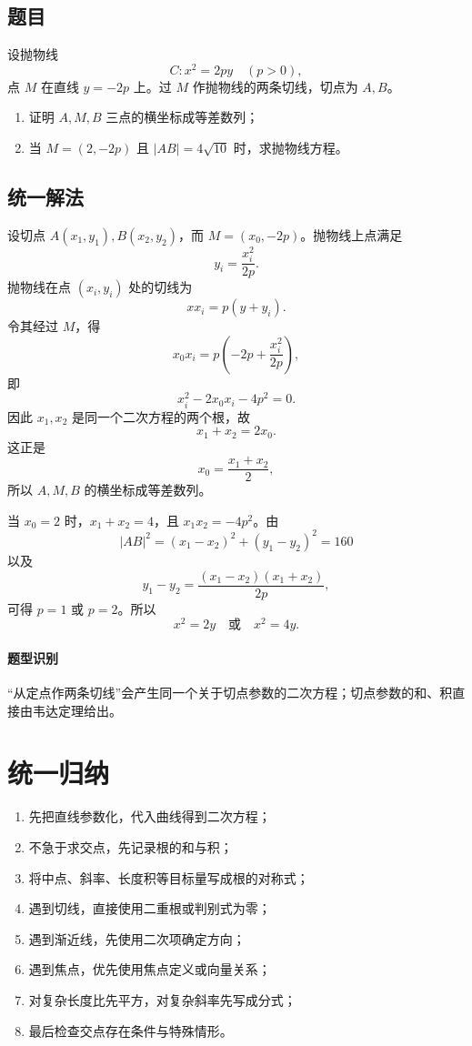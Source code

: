 \documentclass[11pt,a4paper]{ctexart}
\begin{document}
\subsection*{题目}
设抛物线
\[
C:x^2=2py\quad(p>0),
\]
点 $M$ 在直线 $y=-2p$ 上。过 $M$ 作抛物线的两条切线，切点为 $A,B$。

\begin{enumerate}
\item 证明 $A,M,B$ 三点的横坐标成等差数列；
\item 当 $M=(2,-2p)$ 且 $|AB|=4\sqrt{10}$ 时，求抛物线方程。
\end{enumerate}

\subsection*{统一解法}
设切点 $A(x_1,y_1),B(x_2,y_2)$，而 $M=(x_0,-2p)$。抛物线上点满足
\[
y_i=\frac{x_i^2}{2p}.
\]
抛物线在点 $(x_i,y_i)$ 处的切线为
\[
xx_i=p(y+y_i).
\]
令其经过 $M$，得
\[
x_0x_i=p\left(-2p+\frac{x_i^2}{2p}\right),
\]
即
\[
x_i^2-2x_0x_i-4p^2=0.
\]
因此 $x_1,x_2$ 是同一个二次方程的两个根，故
\[
x_1+x_2=2x_0.
\]
这正是
\[
\boxed{x_0=\frac{x_1+x_2}{2}},
\]
所以 $A,M,B$ 的横坐标成等差数列。

当 $x_0=2$ 时，$x_1+x_2=4$，且 $x_1x_2=-4p^2$。由
\[
|AB|^2=(x_1-x_2)^2+(y_1-y_2)^2=160
\]
以及
\[
y_1-y_2=\frac{(x_1-x_2)(x_1+x_2)}{2p},
\]
可得 $p=1$ 或 $p=2$。所以
\[
\boxed{x^2=2y\quad\text{或}\quad x^2=4y}.
\]

\paragraph{题型识别} “从定点作两条切线”会产生同一个关于切点参数的二次方程；切点参数的和、积直接由韦达定理给出。

\section{统一归纳}

\begin{enumerate}
\item 先把直线参数化，代入曲线得到二次方程；
\item 不急于求交点，先记录根的和与积；
\item 将中点、斜率、长度积等目标量写成根的对称式；
\item 遇到切线，直接使用二重根或判别式为零；
\item 遇到渐近线，先使用二次项确定方向；
\item 遇到焦点，优先使用焦点定义或向量关系；
\item 对复杂长度比先平方，对复杂斜率先写成分式；
\item 最后检查交点存在条件与特殊情形。
\end{enumerate}
\end{document}

